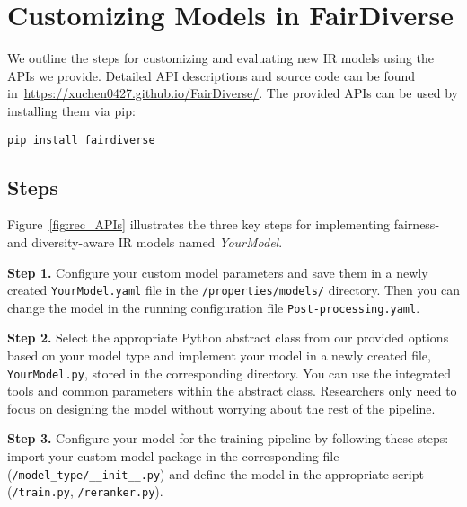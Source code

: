 \section{Customizing Models in FairDiverse}
We outline the steps for customizing and evaluating new IR models using the APIs we provide. Detailed API descriptions and source code can be found in~\url{https://xuchen0427.github.io/FairDiverse/}. 
The provided APIs can be used by installing them via pip: 

\begin{lstlisting}[style=shell]
pip install fairdiverse
\end{lstlisting}


\subsection{Steps}
Figure~\ref{fig:rec_APIs} illustrates the three key steps for implementing fairness- and diversity-aware IR models named \textit{YourModel}.

\noindent\textbf{Step 1.} Configure your custom model parameters and save them in a newly created \texttt{YourModel.yaml} file in the \texttt{/properties/models/} directory. Then you can change the model in the running configuration file \texttt{Post-processing.yaml}.

\noindent\textbf{Step 2.} Select the appropriate Python abstract class from our provided options based on your model type and implement your model in a newly created file, \texttt{YourModel.py}, stored in the corresponding directory. You can use the integrated tools and common parameters within the abstract class. Researchers only need to focus on designing the model without worrying about the rest of the pipeline. 


\noindent\textbf{Step 3.} Configure your model for the training pipeline by following these steps: import your custom model package in the corresponding file (\texttt{/model\_type/\_\_init\_\_.py}) and define the model in the appropriate script (\texttt{/train.py}, \texttt{/reranker.py}).


